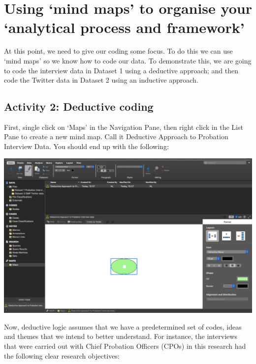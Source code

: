\documentclass[
]{book}
\begin{document}
\hypertarget{using-mind-maps-to-organise-your-analytical-process-and-framework}{%
\section{Using `mind maps' to organise your `analytical process and framework'}\label{using-mind-maps-to-organise-your-analytical-process-and-framework}}

At this point, we need to give our coding some focus. To do this we can use `mind maps' so we know how to code our data. To demonstrate this, we are going to code the interview data in Dataset 1 using a deductive approach; and then code the Twitter data in Dataset 2 using an inductive approach.

\hypertarget{activity-2-deductive-coding}{%
\subsection{Activity 2: Deductive coding}\label{activity-2-deductive-coding}}

First, single click on `Maps' in the Navigation Pane, then right click in the List Pane to create a new mind map. Call it Deductive Approach to Probation Interview Data. You should end up with the following:

\includegraphics{imgs/mindmap.png}

Now, deductive logic assumes that we have a predetermined set of codes, ideas and themes that we intend to better understand. For instance, the interviews that were carried out with Chief Probation Officers (CPOs) in this research had the following clear research objectives:
\end{document}
